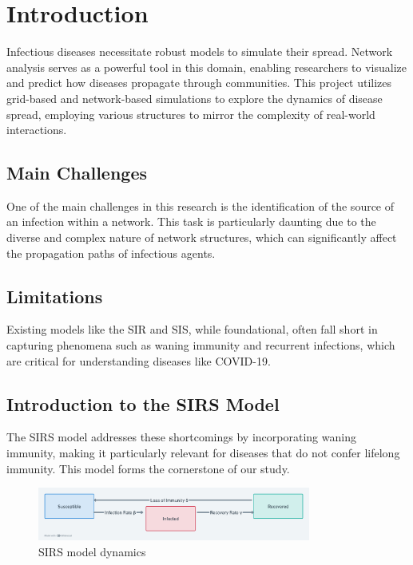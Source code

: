 \chapter{Introduction}
Infectious diseases necessitate robust models to simulate their spread. Network analysis serves as a powerful tool in this domain, enabling researchers to visualize and predict how diseases propagate through communities. This project utilizes grid-based and network-based simulations to explore the dynamics of disease spread, employing various structures to mirror the complexity of real-world interactions.

\section{Main Challenges}
One of the main challenges in this research is the identification of the source of an infection within a network. This task is particularly daunting due to the diverse and complex nature of network structures, which can significantly affect the propagation paths of infectious agents.

\section{Limitations}
Existing models like the SIR and SIS, while foundational, often fall short in capturing phenomena such as waning immunity and recurrent infections, which are critical for understanding diseases like COVID-19.

\section{Introduction to the SIRS Model}
The SIRS model addresses these shortcomings by incorporating waning immunity, making it particularly relevant for diseases that do not confer lifelong immunity. This model forms the cornerstone of our study.

\begin{figure}[H]
    \centering
    \includegraphics[width=0.8\textwidth]{SIRS_Model_Dynamics.png}
    \caption{SIRS model dynamics}
    \label{fig:SIRS_Model_Dynamics}
\end{figure}


